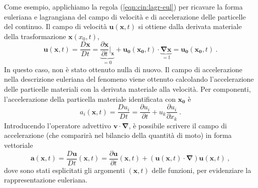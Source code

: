 Come esempio, applichiamo la regola (\ref{eqn:cin:lagr-eul}) per ricavare la forma euleriana e lagrangiana del campo di velocità e di accelerazione delle particelle del continuo. Il campo di velocità $\bm{u}(\bm{x},t)$ si ottiene dalla derivata materiale della trasformazione $\bm{x}(x_0,t)$,
\begin{equation}
 \bm{u}(\bm{x},t) = \dfrac{D \bm{x}}{D t} = \underbrace{\dfrac{\partial \bm{x}}{\partial t}\bigg|_{\bm{x}} }_{=0} + \bm{u_0}(\bm{x_0},t) \cdot \underbrace{ \bm{\nabla} \bm{x} }_{=\mathbb{I}} =
 \bm{u_0}(\bm{x_0},t) \ .
\end{equation}
In questo caso, non è stato ottenuto nulla di nuovo. Il campo di accelerazione nella descrizione euleriana del fenomeno viene ottenuto calcolando l'accelerazione delle particelle materiali con la derivata materiale alla velocità. Per componenti, l'accelerazione della particella materiale identificata con $\bm{x_0}$ è
\begin{equation}
 a_{i}(\bm{x},t) = \dfrac{D u_{i}}{D t} = 
 \dfrac{\partial u_i}{\partial t} + u_{k} \dfrac{\partial u_i}{\partial x_k} \ .
\end{equation}
Introducendo l'operatore advettivo $\bm{v}\cdot \bm{\nabla}$, è possibile scrivere il campo di accelerazione (che comparirà nel bilancio della quantità di moto) in forma vettoriale
\begin{equation}
 \bm{a}(\bm{x},t) = \dfrac{D \bm{u}}{D t}(\bm{x},t) = \dfrac{\partial \bm{u}}{\partial t}(\bm{x},t) + (\bm{u}(\bm{x},t) \cdot \bm{\nabla}) \bm{u}(\bm{x},t) \ ,
\end{equation}
dove sono stati esplicitati gli argomenti $(\bm{x},t)$ delle funzioni, per evidenziare la rappresentazione euleriana. 

